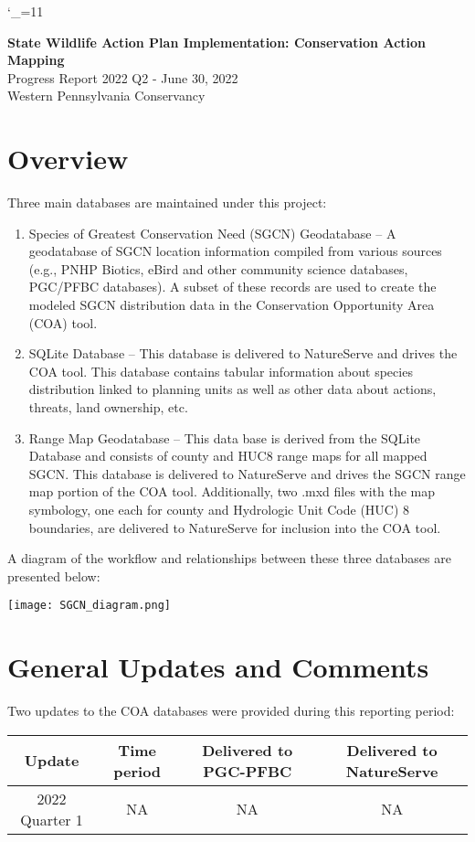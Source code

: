 \documentclass{article}\usepackage[]{graphicx}\usepackage[table]{xcolor}
\begin{document}
\catcode`\_=11

\begin{center}
  \Large \textbf{State Wildlife Action Plan Implementation: Conservation Action Mapping} \\
  \large Progress Report 2022 Q2 - June 30, 2022 \\
  \large Western Pennsylvania Conservancy \\
\end{center}

\section*{Overview}
\noindent Three main databases are maintained under this project:
\begin{enumerate}
 \item{Species of Greatest Conservation Need (SGCN) Geodatabase – A geodatabase of SGCN location information compiled from various sources (e.g., PNHP Biotics, eBird and other community science databases, PGC/PFBC databases). A subset of these records are used to create the modeled SGCN distribution data in the Conservation Opportunity Area (COA) tool.}
 \item{SQLite Database – This database is delivered to NatureServe and drives the COA tool. This database contains tabular information about species distribution linked to planning units as well as other data about actions, threats, land ownership, etc.}
 \item{Range Map Geodatabase – This data base is derived from the SQLite Database and consists of county and HUC8 range maps for all mapped SGCN. This database is delivered to NatureServe and drives the SGCN range map portion of the COA tool. Additionally, two .mxd files with the map symbology, one each for county and Hydrologic Unit Code (HUC) 8 boundaries, are delivered to NatureServe for inclusion into the COA tool.\\}
\end{enumerate}

\noindent A diagram of the workflow and relationships between these three databases are presented below:

  \begin{center}
    \texttt{[image: SGCN\_diagram.png]}
  \end{center}

\section*{General Updates and Comments}
\noindent Two updates to the COA databases were provided during this reporting period:
\begin{center}
\begin{tabular}{cccc} 
 \hline
 Update	& Time period	& Delivered to PGC-PFBC	& Delivered to NatureServe \\
 \hline 
2022 Quarter 1 & NA & NA & NA \\
 \hline
\end{tabular}
\end{center}
\end{document}
